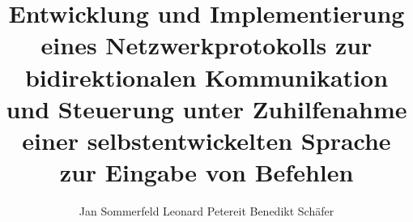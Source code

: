 \documentclass[10pt,a4paper]{scrartcl}
\begin{document}
\title{Entwicklung und Implementierung eines Netzwerkprotokolls zur bidirektionalen Kommunikation und Steuerung unter Zuhilfenahme einer selbstentwickelten Sprache zur Eingabe von Befehlen}
\author{Jan Sommerfeld Leonard Petereit Benedikt Schäfer}
\maketitle
\tableofcontents
\newpage




\end{document}
